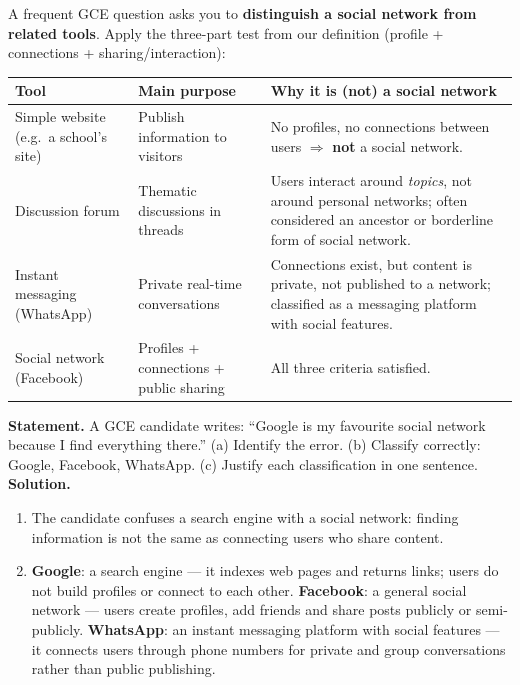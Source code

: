 \documentclass[11pt]{article}
\newcommand{\cle}[1]{{\popxbold\color{popdark}#1}}
\begin{document}
A frequent GCE question asks you to \textbf{distinguish a social network from related tools}. Apply the three-part test from our definition (profile + connections + sharing/interaction):

\begin{center}
\begin{tabularx}{\linewidth}{|l|X|X|}
\hline
\rowcolor{popblueL} \textbf{Tool} & \textbf{Main purpose} & \textbf{Why it is (not) a social network} \\
\hline
Simple website (e.g.\ a school's site) & Publish information to visitors & No profiles, no connections between users $\Rightarrow$ \textbf{not} a social network. \\
\hline
Discussion forum & Thematic discussions in threads & Users interact around \emph{topics}, not around personal networks; often considered an ancestor or borderline form of social network. \\
\hline
Instant messaging (WhatsApp) & Private real-time conversations & Connections exist, but content is private, not published to a network; classified as a messaging platform with social features. \\
\hline
Social network (Facebook) & Profiles + connections + public sharing & All three criteria satisfied. \\
\hline
\end{tabularx}
\end{center}

\begin{exoresolu}
\textbf{Statement.} A GCE candidate writes: ``Google is my favourite social network because I find everything there.'' (a) Identify the error. (b) Classify correctly: Google, Facebook, WhatsApp. (c) Justify each classification in one sentence.
\tcblower
\textbf{Solution.}
\begin{enumerate}
\item[(a)] The candidate confuses a \cle{search engine} with a \cle{social network}: finding information is not the same as connecting users who share content.
\item[(b)--(c)] \textbf{Google}: a search engine --- it indexes web pages and returns links; users do not build profiles or connect to each other. \textbf{Facebook}: a general social network --- users create profiles, add friends and share posts publicly or semi-publicly. \textbf{WhatsApp}: an instant messaging platform with social features --- it connects users through phone numbers for private and group conversations rather than public publishing.
\end{enumerate}
\end{exoresolu}
\end{document}
